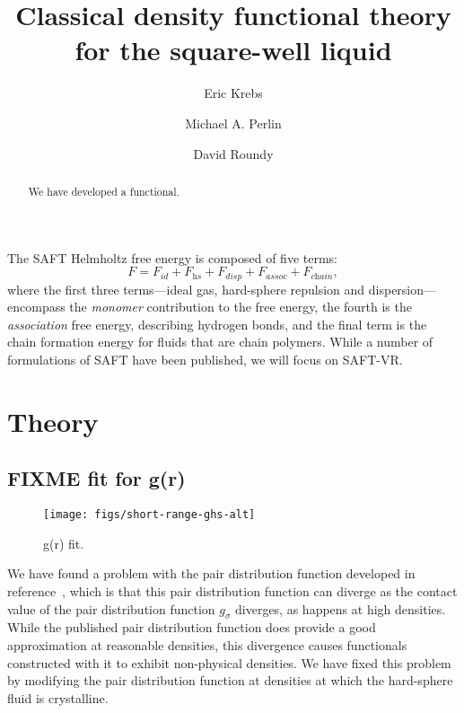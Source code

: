 \documentclass[letterpaper,twocolumn,amsmath,amssymb,pre,aps,10pt]{revtex4-1}
\begin{document}
\title{Classical density functional theory for the square-well liquid}

\author{Eric Krebs}
\author{Michael A. Perlin}
\author{David Roundy}

\begin{abstract}
  We have developed a functional.
\end{abstract}

\maketitle

The SAFT Helmholtz free energy is composed of five terms:
\begin{equation} \label{eq:SAFT-free-energy}
  F = F_\textit{id} + F_\textit{hs} + F_\textit{disp} +
  F_\textit{assoc} + F_\textit{chain},
\end{equation}
where the first three terms---ideal gas, hard-sphere repulsion and
dispersion---encompass the \emph{monomer} contribution
to the free energy, the fourth is the \emph{association} free energy,
describing hydrogen bonds, and the final term is the chain formation
energy for fluids that are chain polymers.  While a
number of formulations of SAFT have been published, we will focus on
SAFT-VR\cite{gil-villegas-1997-SAFT-VR}.

\newcommand\etadisp{\ensuremath{\eta_\textit{d}}}
\newcommand\epsilondisp{\ensuremath{\epsilon_\textit{d}}}
\newcommand\lambdadisp{\ensuremath{\lambda_\textit{d}}}
\newcommand\lscale{\ensuremath{s_d}}


\section{Theory}

\subsection{FIXME fit for g(r)}

\begin{figure}
  \begin{center}
    \texttt{[image: figs/short-range-ghs-alt]}
  \end{center}
  \caption{g(r) fit.}
  \label{fig:gr}
\end{figure}

We have found a problem with the pair distribution function developed
in reference~, which is that this pair
distribution function can diverge as the contact value of the pair
distribution function $g_\sigma$ diverges, as happens at high
densities.  While the published pair distribution function does
provide a good approximation at reasonable densities, this divergence
causes functionals constructed with it to exhibit non-physical
densities.  We have fixed this problem by modifying the
pair distribution function at densities at which the hard-sphere fluid
is crystalline.
\end{document}
